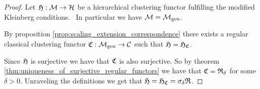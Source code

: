 \begin{proof}
Let $\mathfrak{H}: \mathcal{M} \to \mathcal{H}$ be a hierarchical clustering functor fulfilling the modified Kleinberg conditions. \Ie\ In particular we have $\mathcal{M} = {\mathcal{M}_\mathrm{gen}}$.

By proposition \ref{prop:scaling_extension_correspondence} there exists a regular classical clustering functor $\mathfrak{C}: {\mathcal{M}_\mathrm{gen}} \to \mathcal{C}$ such that $\mathfrak{H} = \mathfrak{H}_{\mathfrak{C}}$.

Since $\mathfrak{H}$ is surjective we have that $\mathfrak{C}$ is also surjective. So by theorem \ref{thm:uniqueness_of_surjective_regular_functors} we have that $\mathfrak{C} = \mathfrak{R}_\delta$ for some $\delta > 0$. Unraveling the definitions we get that $\mathfrak{H} = \mathfrak{H}_{\mathfrak{C}} = \sigma_\delta \mathfrak{R}$.
\end{proof}
